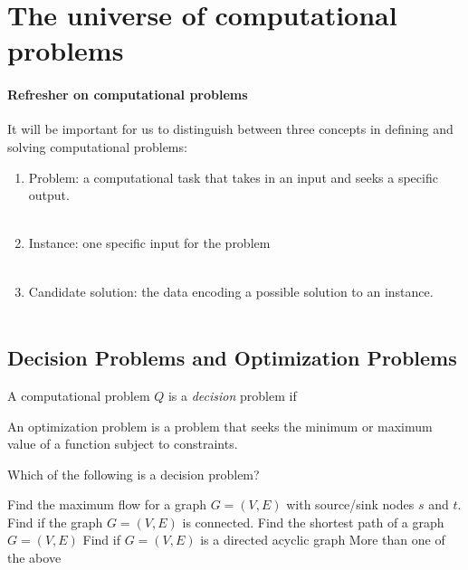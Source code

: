 \documentclass[11  pt]{article}
\begin{document}
	
	
	\section{The universe of computational problems}
	\vspace{5cm}
	

	
	\paragraph{Refresher on computational problems}
	It will be important for us to distinguish between three concepts in defining and solving computational problems:
	\begin{enumerate}
		\item Problem: a computational task that takes in an input and seeks a specific output. \\ \\
		\item Instance:  one specific input for the problem \\ \\
		\item Candidate solution: the data encoding a possible solution to an instance. \\ \\
	\end{enumerate}

	\newpage
	
	\subsection{Decision Problems and Optimization Problems}
	A computational problem $Q$ is a \emph{decision} problem if \\%
	
	
	\vfill
	
	An optimization problem is a problem that seeks the minimum or maximum value of a function subject to constraints. \\
	
		\begin{Qu}
		Which of the following is a decision problem?
		\begin{itemize}
			\aitem Find the maximum flow for a graph $G = (V,E)$ with source/sink nodes $s$ and $t$.
			\bitem Find if the graph $G = (V,E)$ is connected.
			\citem Find the shortest path of a graph $G = (V,E)$
			\ditem Find if $G = (V,E)$ is a directed acyclic graph
			\eitem More than one of the above
		\end{itemize}
	\end{Qu}
\end{document}
